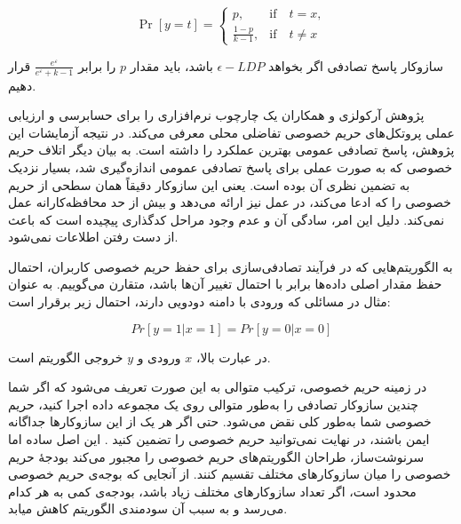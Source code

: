 \begin{equation}
\Pr[y = t] = 
\begin{cases} 
p, & \text{if} \quad t = x, \\[10pt]
\frac{1 - p}{k - 1}, & \text{if} \quad t \neq x
\end{cases}
\label{equ:GRR}
\end{equation}


سازوکار پاسخ تصادفی اگر بخواهد $\epsilon{-}LDP$ باشد، باید مقدار $p$ را برابر $\frac{e^{\varepsilon}}{e^{\varepsilon}+k-1}$ قرار دهیم.

پژوهش آرکولزی و همکاران  یک چارچوب نرم‌افزاری را برای حسابرسی و ارزیابی عملی پروتکل‌های حریم خصوصی تفاضلی محلی معرفی می‌کند. در نتیجه آزمایشات این پژوهش، پاسخ تصادفی عمومی بهترین عملکرد را داشته است. به بیان دیگر اتلاف حریم خصوصی که به صورت عملی برای پاسخ تصادفی عمومی اندازه‌گیری شد، بسیار نزدیک به تضمین نظری آن بوده است. یعنی این سازوکار دقیقاً همان سطحی از حریم خصوصی را که ادعا می‌کند، در عمل نیز ارائه می‌دهد و بیش از حد محافظه‌کارانه عمل نمی‌کند. دلیل این امر، سادگی آن و عدم وجود مراحل کدگذاری پیچیده است که باعث از دست رفتن اطلاعات نمی‌شود.


به الگوریتم‌هایی که در فرآیند تصادفی‌سازی برای حفظ حریم خصوصی کاربران، احتمال حفظ مقدار اصلی داده‌ها برابر با احتمال تغییر آن‌ها باشد، متقارن می‌گوییم. به عنوان مثال در مسائلی که ورودی با دامنه دودویی دارند، احتمال زیر برقرار است:

\begin{equation}
Pr[y = 1 | x = 1] = Pr[y = 0 | x = 0] 
\end{equation}

در عبارت بالا، $x$ ورودی و $y$ خروجی الگوریتم است.


در زمینه حریم خصوصی، ترکیب متوالی به این صورت تعریف می‌شود که اگر شما چندین سازوکار تصادفی را به‌طور متوالی روی یک مجموعه داده اجرا کنید، حریم خصوصی شما به‌طور کلی نقض می‌شود. حتی اگر هر یک از این سازوکار‌ها جداگانه ایمن باشند، در نهایت نمی‌توانید حریم خصوصی را تضمین کنید . این اصل ساده اما سرنوشت‌ساز، طراحان الگوریتم‌های حریم خصوصی را مجبور می‌کند بودجهٔ حریم خصوصی را میان سازوکارهای مختلف تقسیم کنند. از آنجایی که بوجه‌ی حریم خصوصی محدود است، اگر تعداد سازوکارهای مختلف زیاد باشد، بودجه‌ی کمی به هر کدام می‌رسد و به سبب آن سودمندی الگوریتم کاهش میابد.

